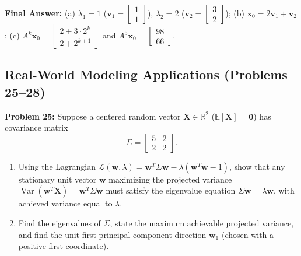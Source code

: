 \documentclass[11pt, letterpaper]{article}
\theoremstyle{definition}
\theoremstyle{remark}
\begin{document}
\textbf{Final Answer:} (a) $\lambda_1 = 1$ ($\mathbf{v}_1 = \begin{bmatrix} 1 \\ 1 \end{bmatrix}$), $\lambda_2 = 2$ ($\mathbf{v}_2 = \begin{bmatrix} 3 \\ 2 \end{bmatrix}$); (b) $\mathbf{x}_0 = 2\mathbf{v}_1 + \mathbf{v}_2$; (c) $A^k\mathbf{x}_0 = \begin{bmatrix} 2 + 3\cdot 2^k \\ 2 + 2^{k+1} \end{bmatrix}$ and $A^5\mathbf{x}_0 = \begin{bmatrix} 98 \\ 66 \end{bmatrix}$.

\subsection{Real-World Modeling Applications (Problems 25--28)}

\textbf{Problem 25:}
Suppose a centered random vector $\mathbf{X} \in \mathbb{R}^2$ ($\mathbb{E}[\mathbf{X}] = \mathbf{0}$) has covariance matrix
\[
\Sigma = \begin{bmatrix} 5 & 2 \\ 2 & 2 \end{bmatrix}.
\]
\begin{enumerate}[label=(\alph*)]
    \item Using the Lagrangian $\mathcal{L}(\mathbf{w}, \lambda) = \mathbf{w}^T \Sigma \mathbf{w} - \lambda(\mathbf{w}^T \mathbf{w} - 1)$, show that any stationary unit vector $\mathbf{w}$ maximizing the projected variance $\operatorname{Var}(\mathbf{w}^T \mathbf{X}) = \mathbf{w}^T \Sigma \mathbf{w}$ must satisfy the eigenvalue equation $\Sigma\mathbf{w} = \lambda\mathbf{w}$, with achieved variance equal to $\lambda$.
    \item Find the eigenvalues of $\Sigma$, state the maximum achievable projected variance, and find the unit first principal component direction $\mathbf{w}_1$ (chosen with a positive first coordinate).
\end{enumerate}
\end{document}
